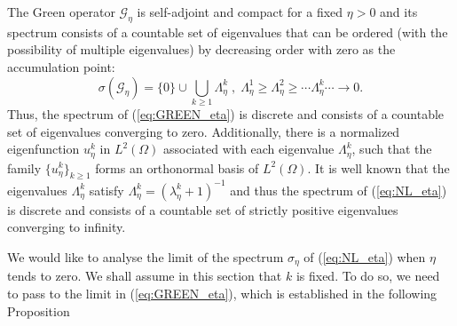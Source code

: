 \documentclass[a4paper,reqno]{amsart}
\numberwithin{equation}{section}
\numberwithin{equation}{section}		%
\numberwithin{figure}{section}			%
\numberwithin{table}{section}				%
\theoremstyle{definition}
\newcommand{\<}{\ensuremath \leq}
\renewcommand{\>}{\ensuremath \geq}
\def\e{\eta}
\begin{document}
The Green operator ${\mathcal G}_\eta$ is self-adjoint and compact for a fixed $\eta>0$ and its spectrum consists of a countable set of eigenvalues that can be ordered (with the possibility of multiple eigenvalues) by decreasing order with zero as the accumulation point:
\begin{equation}
    \sigma({\mathcal G}_\eta)=\{0\}\cup\bigcup_{k\geq 1}\Lambda^k_\eta \; , \; \Lambda^1_\eta\geq \Lambda^2_\eta\geq
    \cdots
    \Lambda^k_\eta \cdots \to 0.
\end{equation}
Thus, the spectrum of (\ref{eq:GREEN_eta}) is discrete and consists of a countable set of eigenvalues converging to zero. Additionally, there is a normalized eigenfunction $u^k_\eta$ in $L^2(\Omega)$ associated with each eigenvalue $\Lambda_\eta^k$, such that the family $\{u^k_\eta\}_{k\geq 1}$ forms an orthonormal basis of $L^2(\Omega)$. It is well known \cite{bensoussan2011asymptotic} that the  eigenvalues $\Lambda_\eta^k$ satisfy $\Lambda_\eta^k=(\lambda_\eta^k+1)^{-1}$ and thus
the spectrum of (\ref{eq:NL_eta}) is discrete and consists of a countable set of strictly positive eigenvalues converging to infinity. 

We would like to analyse the limit of the spectrum $\sigma_\eta$ of (\ref{eq:NL_eta}) when $\eta$ tends to zero. We shall assume in this section that $k$ is fixed. To do so, we need to pass to the limit in (\ref{eq:GREEN_eta}), which is established in the following Proposition

\end{document}
